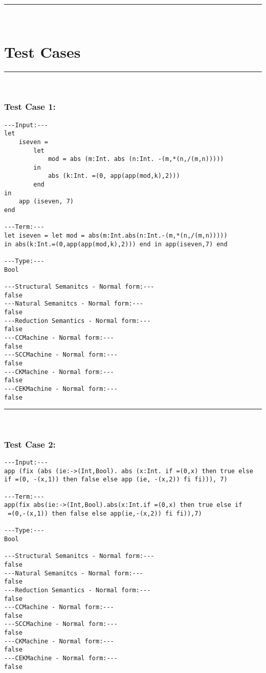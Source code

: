 \documentclass[10pt]{article}
\newcommand{\horrule}[1]{\rule{\linewidth}{#1}}
\begin{document}
\horrule{0.5pt} \\[0.2cm]


\section*{Test Cases}

\horrule{1pt} \\[0.2cm]	

\subsubsection*{Test Case 1:}

\begin{lstlisting}
---Input:---
let
	iseven =
		let
			mod = abs (m:Int. abs (n:Int. -(m,*(n,/(m,n)))))
		in
			abs (k:Int. =(0, app(app(mod,k),2)))
		end
in
	app (iseven, 7)
end

---Term:---
let iseven = let mod = abs(m:Int.abs(n:Int.-(m,*(n,/(m,n)))))
in abs(k:Int.=(0,app(app(mod,k),2))) end in app(iseven,7) end

---Type:---
Bool

---Structural Semanitcs - Normal form:---
false
---Natural Semanitcs - Normal form:---
false
---Reduction Semantics - Normal form:---
false
---CCMachine - Normal form:---
false
---SCCMachine - Normal form:---
false
---CKMachine - Normal form:---
false
---CEKMachine - Normal form:---
false
\end{lstlisting}

\horrule{0.5pt} \\[0.2cm]	

\subsubsection*{Test Case 2:}

\begin{lstlisting}
---Input:---
app (fix (abs (ie:->(Int,Bool). abs (x:Int. if =(0,x) then true else
if =(0, -(x,1)) then false else app (ie, -(x,2)) fi fi))), 7)

---Term:---
app(fix abs(ie:->(Int,Bool).abs(x:Int.if =(0,x) then true else if
 =(0,-(x,1)) then false else app(ie,-(x,2)) fi fi)),7)

---Type:---
Bool

---Structural Semanitcs - Normal form:---
false
---Natural Semanitcs - Normal form:---
false
---Reduction Semantics - Normal form:---
false
---CCMachine - Normal form:---
false
---SCCMachine - Normal form:---
false
---CKMachine - Normal form:---
false
---CEKMachine - Normal form:---
false
\end{lstlisting}
\end{document}
